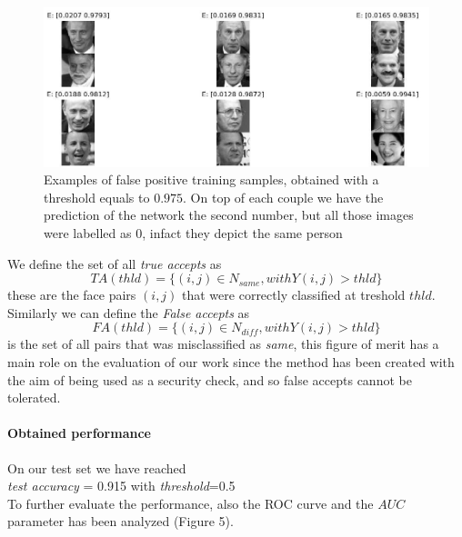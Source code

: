 \begin{figure}[t]
\includegraphics[width=1\linewidth]{images/falsepositive.jpg}
   \caption{Examples of false positive training samples, obtained with a threshold equals to $0.975$. On top of each couple we have the prediction of the network \ie the second number, but all those images were labelled as 0, infact they depict the same person}
\label{fig:long}
\label{fig:onecol}
\end{figure} 
 
We define the set of all \textit{true accepts} as
\begin{equation}
TA(thld)=\{(i,j) \in N_{same}, with Y(i,j) > thld\}
\end{equation}
these are the face pairs $(i,j)$ that were correctly classified at treshold $thld$.
Similarly we can define the \textit{False accepts} as 
\begin{equation}
FA(thld)=\{(i,j) \in N_{diff}, with Y(i,j) > thld\} 
\end{equation}
is the set of all pairs that was misclassified as \textit{same}, this figure of merit has a main role on the evaluation of our work since the method has been created with the aim of being used as a security check, and so false accepts cannot be tolerated.
\paragraph{Obtained performance}
On our test set we have reached \\

\textit{test accuracy }= 0.915 with \textit{threshold}=0.5
\\

To further evaluate the performance, also the ROC curve and the $AUC$ parameter has been analyzed (Figure 5).

